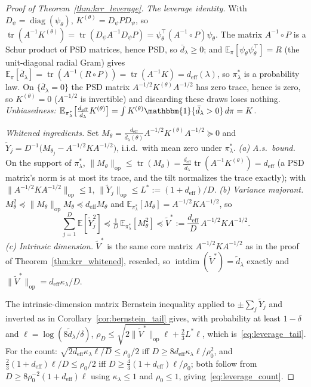 \documentclass{article}
\DeclareMathOperator{\diag}{diag}
\begin{document}
\begin{proof}[Proof of Theorem~\ref{thm:krr_leverage}]
\emph{The leverage identity.} With $D_\psi=\diag(\psi_\theta)$, $K^{(\theta)}=D_\psi PD_\psi$, so $\operatorname{tr}(A^{-1}K^{(\theta)})=\operatorname{tr}(D_\psi A^{-1}D_\psi P)=\psi_\theta^\top(A^{-1}\circ P)\psi_\theta$. The matrix $A^{-1}\circ P$ is a Schur product of PSD matrices, hence PSD, so $\bar d_\lambda\ge0$; and $\mathbb{E}_\pi[\psi_\theta\psi_\theta^\top]=R$ (the unit-diagonal radial Gram) gives $\mathbb{E}_\pi[\bar d_\lambda]=\operatorname{tr}(A^{-1}(R\circ P))=\operatorname{tr}(A^{-1}K)=d_{\mathrm{eff}}(\lambda)$, so $\pi^*_\lambda$ is a probability law. On $\{\bar d_\lambda=0\}$ the PSD matrix $A^{-1/2}K^{(\theta)}A^{-1/2}$ has zero trace, hence is zero, so $K^{(\theta)}=0$ ($A^{-1/2}$ is invertible) and discarding these draws loses nothing. \emph{Unbiasedness:} $\mathbb{E}_{\pi^*_\lambda}\bigl[\tfrac{d_{\mathrm{eff}}}{\bar d_\lambda}K^{(\theta)}\bigr]=\int K^{(\theta)}\mathbbm{1}\{\bar d_\lambda>0\}\,d\pi=K$.

\emph{Whitened ingredients.} Set $M_\theta=\tfrac{d_{\mathrm{eff}}}{\bar d_\lambda(\theta)}A^{-1/2}K^{(\theta)}A^{-1/2}\succeq0$ and $\widetilde Y_j=D^{-1}\bigl(M_{\theta_j}-A^{-1/2}KA^{-1/2}\bigr)$, i.i.d.\ with mean zero under $\pi^*_\lambda$. \emph{(a) A.s.\ bound.} On the support of $\pi^*_\lambda$, $\|M_\theta\|_{\mathrm{op}}\le\operatorname{tr}(M_\theta)=\tfrac{d_{\mathrm{eff}}}{\bar d_\lambda}\operatorname{tr}(A^{-1}K^{(\theta)})=d_{\mathrm{eff}}$ (a PSD matrix's norm is at most its trace, and the tilt normalizes the trace exactly); with $\|A^{-1/2}KA^{-1/2}\|_{\mathrm{op}}\le1$, $\|\widetilde Y_j\|_{\mathrm{op}}\le L^*:=(1+d_{\mathrm{eff}})/D$. \emph{(b) Variance majorant.} $M_\theta^2\preceq\|M_\theta\|_{\mathrm{op}}M_\theta\preceq d_{\mathrm{eff}}M_\theta$ and $\mathbb{E}_{\pi^*_\lambda}[M_\theta]=A^{-1/2}KA^{-1/2}$, so
\[
\sum_{j=1}^D\mathbb{E}[\widetilde Y_j^2]\preceq\tfrac1D\,\mathbb{E}_{\pi^*_\lambda}[M_\theta^2]\preceq\widetilde V^*:=\frac{d_{\mathrm{eff}}}{D}\,A^{-1/2}KA^{-1/2}.
\]
\emph{(c) Intrinsic dimension.} $\widetilde V^*$ is the same core matrix $A^{-1/2}KA^{-1/2}$ as in the proof of Theorem~\ref{thm:krr_whitened}, rescaled, so $\operatorname{intdim}(\widetilde V^*)=\tilde d_\lambda$ exactly and $\|\widetilde V^*\|_{\mathrm{op}}=d_{\mathrm{eff}}\kappa_\lambda/D$.

The intrinsic-dimension matrix Bernstein inequality applied to $\pm\sum_j\widetilde Y_j$ and inverted as in Corollary~\ref{cor:bernstein_tail} gives, with probability at least $1-\delta$ and $\ell=\log(8\tilde d_\lambda/\delta)$, $\rho_D\le\sqrt{2\|\widetilde V^*\|_{\mathrm{op}}\ell}+\tfrac23L^*\ell$, which is~\eqref{eq:leverage_tail}. For the count: $\sqrt{2d_{\mathrm{eff}}\kappa_\lambda\ell/D}\le\rho_0/2$ iff $D\ge8d_{\mathrm{eff}}\kappa_\lambda\ell/\rho_0^2$, and $\tfrac23(1+d_{\mathrm{eff}})\ell/D\le\rho_0/2$ iff $D\ge\tfrac43(1+d_{\mathrm{eff}})\ell/\rho_0$; both follow from $D\ge8\rho_0^{-2}(1+d_{\mathrm{eff}})\ell$ using $\kappa_\lambda\le1$ and $\rho_0\le1$, giving~\eqref{eq:leverage_count}.
\end{proof}
\end{document}
